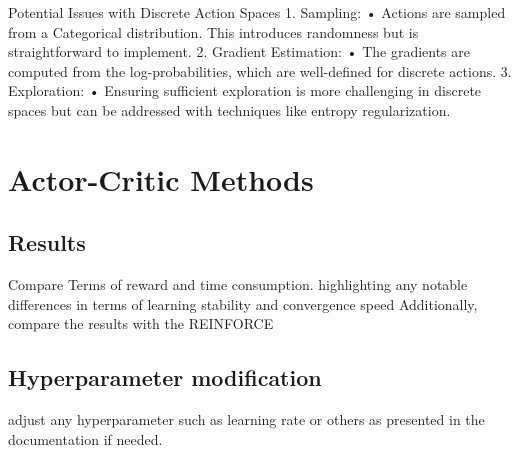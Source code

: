 \documentclass{article}
\begin{document}
Potential Issues with Discrete Action Spaces
1.	Sampling:
•	Actions are sampled from a Categorical distribution. This introduces randomness but is straightforward to implement.
2.	Gradient Estimation:
•	The gradients are computed from the log-probabilities, which are well-defined for discrete actions.
3.	Exploration:
•	Ensuring sufficient exploration is more challenging in discrete spaces but can be addressed with techniques like entropy regularization.

\section{Actor-Critic Methods}

\subsection{Results}
Compare Terms of reward and time consumption.
highlighting any notable diﬀerences in terms of learning stability and convergence speed
Additionally, compare the results with the REINFORCE 

\subsection{Hyperparameter modification}
adjust any hyperparameter such as learning rate or others as presented in the documentation if
needed.



\end{document}
